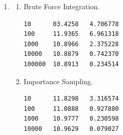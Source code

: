 \documentclass[11 pt]{article}
\begin{document}
\begin{enumerate}
\begin{enumerate}
\begin{figure}[h]
\end{figure}
\end{enumerate}
\item
\begin{enumerate}
\item Brute Force Integration.
\begin{verbatim}
10      03.4258   4.706778
100     11.9365   6.961318
1000    10.8966   2.375228
10000   10.8879   0.742370
100000  10.8913   0.234514
\end{verbatim}
\item Importance Sampling.
\begin{verbatim}
10      11.8298   3.316574
100     11.0888   0.927880
1000    10.9777   0.230598
10000   10.9629   0.079027
\end{verbatim}
\end{enumerate}
\end{enumerate}
\end{document}

